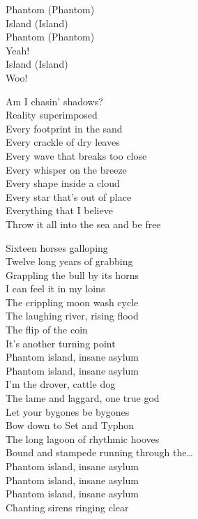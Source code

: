 Phantom (Phantom) \\
Island (Island) \\
Phantom (Phantom) \\
Yeah! \\
Island (Island) \\
Woo! \\


Am I chasin' shadows? \\
Reality superimposed \\
Every footprint in the sand \\
Every crackle of dry leaves \\
Every wave that breaks too close \\
Every whisper on the breeze \\
Every shape inside a cloud \\
Every star that's out of place \\
Everything that I believe \\
Throw it all into the sea and be free \\


Sixteen horses galloping \\
Twelve long years of grabbing \\
Grappling the bull by its horns \\
I can feel it in my loins \\
The crippling moon wash cycle \\
The laughing river, rising flood \\
The flip of the coin \\
It's another turning point \\

Phantom island, insane asylum \\
Phantom island, insane asylum \\
I'm the drover, cattle dog \\
The lame and laggard, one true god \\

Let your bygones be bygones \\
Bow down to Set and Typhon \\
The long lagoon of rhythmic hooves \\
Bound and stampede running through the… \\

Phantom island, insane asylum \\
Phantom island, insane asylum \\
Phantom island, insane asylum \\
Chanting sirens ringing clear \\

